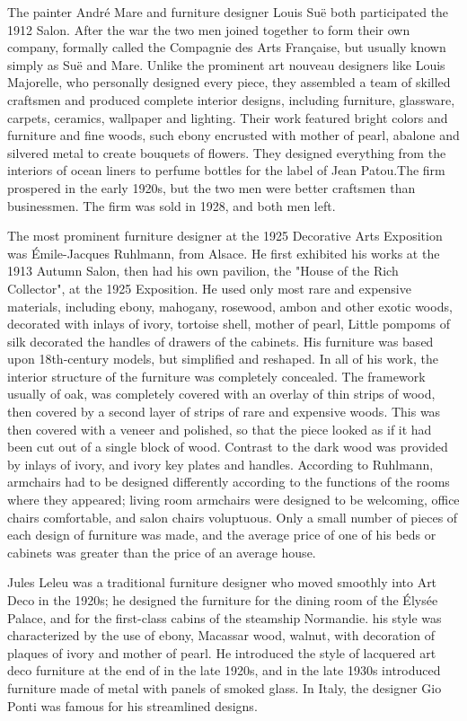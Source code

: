 The painter André Mare and furniture designer Louis Suë both
participated the 1912 Salon. After the war the two men joined together
to form their own company, formally called the Compagnie des Arts
Française, but usually known simply as Suë and Mare. Unlike the
prominent art nouveau designers like Louis Majorelle, who personally
designed every piece, they assembled a team of skilled craftsmen and
produced complete interior designs, including furniture, glassware,
carpets, ceramics, wallpaper and lighting. Their work featured bright
colors and furniture and fine woods, such ebony encrusted with mother of
pearl, abalone and silvered metal to create bouquets of flowers. They
designed everything from the interiors of ocean liners to perfume
bottles for the label of Jean Patou.The firm prospered in the early
1920s, but the two men were better craftsmen than businessmen. The firm
was sold in 1928, and both men left.

The most prominent furniture designer at the 1925 Decorative Arts
Exposition was Émile-Jacques Ruhlmann, from Alsace. He first exhibited
his works at the 1913 Autumn Salon, then had his own pavilion, the
"House of the Rich Collector", at the 1925 Exposition. He used only most
rare and expensive materials, including ebony, mahogany, rosewood, ambon
and other exotic woods, decorated with inlays of ivory, tortoise shell,
mother of pearl, Little pompoms of silk decorated the handles of drawers
of the cabinets. His furniture was based upon 18th-century models, but
simplified and reshaped. In all of his work, the interior structure of
the furniture was completely concealed. The framework usually of oak,
was completely covered with an overlay of thin strips of wood, then
covered by a second layer of strips of rare and expensive woods. This
was then covered with a veneer and polished, so that the piece looked as
if it had been cut out of a single block of wood. Contrast to the dark
wood was provided by inlays of ivory, and ivory key plates and handles.
According to Ruhlmann, armchairs had to be designed differently
according to the functions of the rooms where they appeared; living room
armchairs were designed to be welcoming, office chairs comfortable, and
salon chairs voluptuous. Only a small number of pieces of each design of
furniture was made, and the average price of one of his beds or cabinets
was greater than the price of an average house.

Jules Leleu was a traditional furniture designer who moved smoothly into
Art Deco in the 1920s; he designed the furniture for the dining room of
the Élysée Palace, and for the first-class cabins of the steamship
Normandie. his style was characterized by the use of ebony, Macassar
wood, walnut, with decoration of plaques of ivory and mother of pearl.
He introduced the style of lacquered art deco furniture at the end of in
the late 1920s, and in the late 1930s introduced furniture made of metal
with panels of smoked glass. In Italy, the designer Gio Ponti was famous
for his streamlined designs.

